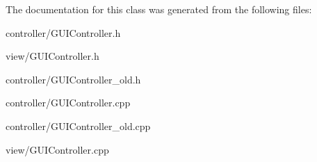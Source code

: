 The documentation for this class was generated from the following files\-:\begin{DoxyCompactItemize}
\item 
controller/G\-U\-I\-Controller.\-h\item 
view/G\-U\-I\-Controller.\-h\item 
controller/G\-U\-I\-Controller\-\_\-old.\-h\item 
controller/G\-U\-I\-Controller.\-cpp\item 
controller/G\-U\-I\-Controller\-\_\-old.\-cpp\item 
view/G\-U\-I\-Controller.\-cpp\end{DoxyCompactItemize}
